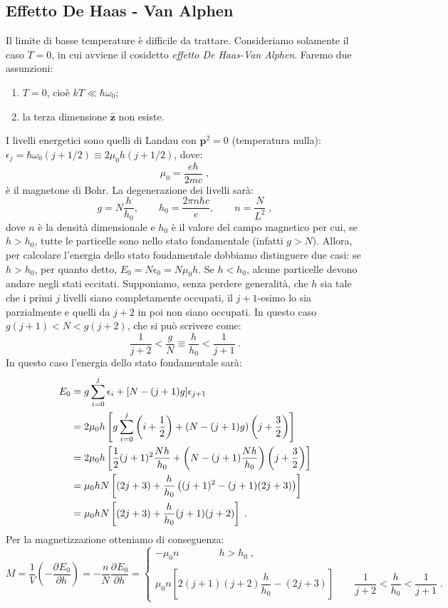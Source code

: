 \documentclass[10pt,a4paper]{report}
\theoremstyle{definition}
\newcommand{\pdev}[3][]{\frac{\partial^{#1} #2}{\partial #3^{#1}}}
\numberwithin{equation}{section}
\begin{document}
\subsection{Effetto De Haas - Van Alphen}
Il limite di basse temperature è difficile da trattare. Consideriamo solamente il caso $T=0$, in cui avviene il cosidetto \emph{effetto De Haas-Van Alphen}. Faremo due assunzioni:
\begin{enumerate}
\item $T=0$, cioè $kT\ll \hbar\omega_0$;
\item la terza dimensione $\hat{\mathbf{z}}$ non esiste.
\end{enumerate}
I livelli energetici sono quelli di Landau con $\mathbf{p}^2=0$ (temperatura nulla): $\epsilon_j=\hbar\omega_0(j+1/2)\equiv 2\mu_0 h(j+1/2)$, dove:
\begin{equation}
\mu_0=\frac{e\hbar}{2mc}\;,
\end{equation}
è il magnetone di Bohr. La degenerazione dei livelli sarà:
$$
g=N\frac{h}{h_0},\qquad h_0=\frac{2\pi n\hbar c}{e},\qquad  n=\frac{N}{L^2}\;,
$$
dove $n$ è la densità dimensionale e $h_0$ è il valore del campo magnetico per cui, se $h>h_0$, tutte le particelle sono nello stato fondamentale (infatti $g>N$). Allora, per calcolare l'energia dello stato fondamentale dobbiamo distinguere due casi: se $h>h_0$, per quanto detto, $E_0=N\epsilon_0=N\mu_0h$. Se $h<h_0$, alcune particelle devono andare negli stati eccitati. Supponiamo, senza perdere generalità, che $h$ sia tale che i primi $j$ livelli siano completamente occupati, il $j+1$-esimo lo sia parzialmente e quelli da $j+2$ in poi non siano occupati. In questo caso $g(j+1)<N<g(j+2)$, che si può scrivere come:
\begin{equation}
\frac{1}{j+2}<\frac{g}{N}\equiv\frac{h}{h_0}<\frac{1}{j+1}\;.
\end{equation}
In questo caso l'energia dello stato fondamentale sarà:
\begin{align}
E_0 &= g\sum_{i=0}^j\epsilon_i+[N-(j+1)g]\epsilon_{j+1} \notag \\
&= 2\mu_0 h\left[g\sum_{i=0}^j\left(i+\frac{1}{2}\right)+(N-(j+1)g)\left(j+\frac{3}{2}\right)\right] \notag \\
&= 2\mu_0 h\left[\frac{1}{2}(j+1)^2\frac{Nh}{h_0}+\left(N-(j+1)\frac{Nh}{h_0}\right)\left(j+\frac{3}{2}\right)\right] \notag \\
&=\mu_0hN\left[(2j+3)+\frac{h}{h_0}\left((j+1)^2-(j+1)(2j+3)\right)\right] \notag \\
&=\mu_0hN\left[(2j+3)+\frac{h}{h_0}(j+1)(j+2)\right]\;.
\end{align}
Per la magnetizzazione otteniamo di conseguenza:
\begin{equation}
M=\frac{1}{V}\left(-\pdev{E_0}{h}\right)=-\frac{n}{N}\pdev{E_0}{h}=\begin{cases}
-\mu_0 n\qquad\qquad h>h_0\;, \\
\\
\mu_0 n\left[2(j+1)(j+2)\dfrac{h}{h_0}-(2j+3)\right]\qquad \dfrac{1}{j+2}<\dfrac{h}{h_0}<\dfrac{1}{j+1}\;.
\end{cases}
\end{equation}
\end{document}
